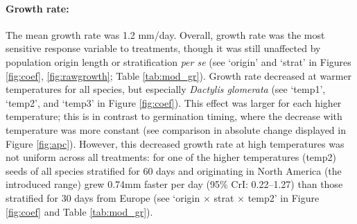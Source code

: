 \documentclass[11pt]{article}\usepackage[]{graphicx}\usepackage[]{color}
\begin{document}
	\paragraph{Growth rate:} The mean growth rate was 1.2 mm/day. Overall, growth rate was the most sensitive response variable to treatments, though it was still unaffected by population origin length or stratification \textit{per se} (see `origin' and `strat' in Figures \ref{fig:coef}, \ref{fig:rawgrowth}; Table \ref{tab:mod_gr}). Growth rate decreased at warmer temperatures for all species, but especially \textit{Dactylis glomerata} (see `temp1', `temp2', and `temp3' in Figure \ref{fig:coef}). This effect was larger for each higher temperature; this is in contrast to germination timing, where the decrease with temperature was more constant (see comparison in absolute change displayed in Figure \ref{fig:apc}). However, this decreased growth rate at high temperatures was not uniform across all treatments: for one of the higher temperatures (temp2) seeds of all species stratified for 60 days and originating in North America (the introduced range) grew 0.74mm faster per day (95\% CrI: 0.22--1.27) than those stratified for 30 days from Europe (see `origin $\times$ strat $\times$ temp2' in Figure \ref{fig:coef} and Table \ref{tab:mod_gr}). 
\end{document}
